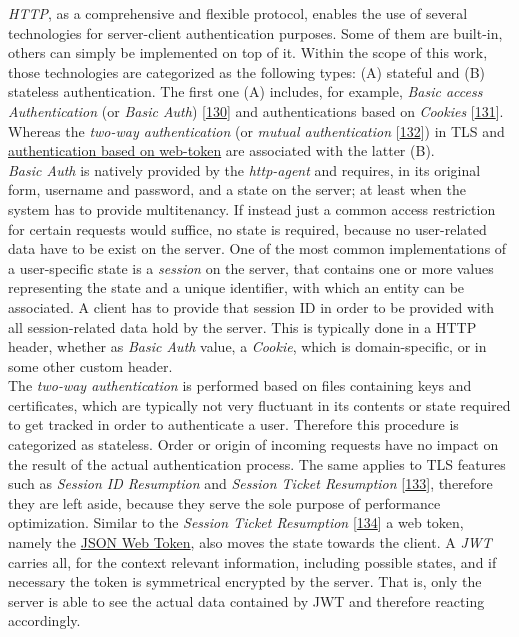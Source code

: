 \documentclass[12pt,english,a4paper,titlepage,cleardoublepage=empty,dottedtoc]{report}
\begin{document}
\emph{HTTP}, as a comprehensive and flexible protocol, enables the use
of several technologies for server-client authentication purposes. Some
of them are built-in, others can simply be implemented on top of it.
Within the scope of this work, those technologies are categorized as the
following types: (A) stateful and (B) stateless authentication. The
first one (A) includes, for example, \emph{Basic access Authentication}
(or \emph{Basic Auth})
{[}\protect\hyperlink{ref-web_spec_basic-auth}{130}{]} and
authentications based on \emph{Cookies}
{[}\protect\hyperlink{ref-web_spec_cookie}{131}{]}. Whereas the
\emph{two-way authentication} (or \emph{mutual authentication}
{[}\protect\hyperlink{ref-web_2017_wikipedia_mutual-auth}{132}{]}) in
TLS and \protect\hyperlink{def--jwt}{authentication based on web-token}
are associated with the latter (B).\\
\emph{Basic Auth} is natively provided by the \emph{http-agent} and
requires, in its original form, username and password, and a state on
the server; at least when the system has to provide multitenancy. If
instead just a common access restriction for certain requests would
suffice, no state is required, because no user-related data have to be
exist on the server. One of the most common implementations of a
user-specific state is a \emph{session} on the server, that contains one
or more values representing the state and a unique identifier, with
which an entity can be associated. A client has to provide that session
ID in order to be provided with all session-related data hold by the
server. This is typically done in a HTTP header, whether as \emph{Basic
Auth} value, a \emph{Cookie}, which is domain-specific, or in some other
custom header.\\
The \emph{two-way authentication} is performed based on files containing
keys and certificates, which are typically not very fluctuant in its
contents or state required to get tracked in order to authenticate a
user. Therefore this procedure is categorized as stateless. Order or
origin of incoming requests have no impact on the result of the actual
authentication process. The same applies to TLS features such as
\emph{Session ID Resumption} and \emph{Session Ticket Resumption}
{[}\protect\hyperlink{ref-book_2013_networking-101_tls-session-resumption}{133}{]},
therefore they are left aside, because they serve the sole purpose of
performance optimization. Similar to the \emph{Session Ticket
Resumption}
{[}\protect\hyperlink{ref-web_spec_tls-session-ticket-resumption}{134}{]}
a web token, namely the \protect\hyperlink{def--jwt}{JSON Web Token},
also moves the state towards the client. A \emph{JWT} carries all, for
the context relevant information, including possible states, and if
necessary the token is symmetrical encrypted by the server. That is,
only the server is able to see the actual data contained by JWT and
therefore reacting accordingly.
\end{document}

